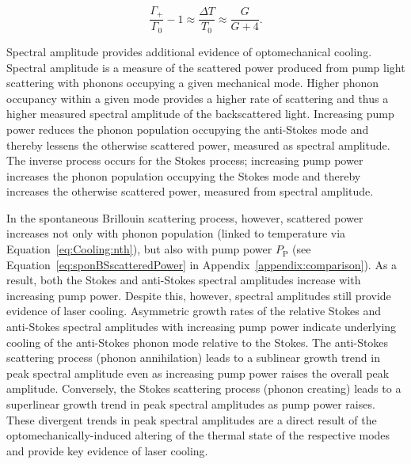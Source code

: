 \begin{equation}
  \frac{\Gamma_{+}}{\Gamma_{0}} - 1 \approx \frac{\Delta T}{T_{0}} \approx \frac{G}{G + 4}.
  \label{eq:Cooliong:two methods of getting temperature}
\end{equation}

Spectral amplitude provides additional evidence of optomechanical cooling. Spectral amplitude is a measure of the scattered power produced from pump light scattering with phonons occupying a given mechanical mode. Higher phonon occupancy within a given mode provides a higher rate of scattering and thus a higher measured spectral amplitude of the backscattered light. Increasing pump power reduces the phonon population occupying the anti-Stokes mode and thereby lessens the otherwise scattered power, measured as spectral amplitude. The inverse process occurs for the Stokes process; increasing pump power increases the phonon population occupying the Stokes mode and thereby increases the otherwise scattered power, measured from spectral amplitude.

In the spontaneous Brillouin scattering process, however, scattered power increases not only with phonon population (linked to temperature via Equation~\ref{eq:Cooling:nth}), but also with pump power \(P_{\mathrm{P}}\) (see Equation~\ref{eq:sponBSscatteredPower} in Appendix~\ref{appendix:comparison}). As a result, both the Stokes and anti-Stokes spectral amplitudes increase with increasing pump power. Despite this, however, spectral amplitudes still provide evidence of laser cooling. Asymmetric growth rates of the relative Stokes and anti-Stokes spectral amplitudes with increasing pump power indicate underlying cooling of the anti-Stokes phonon mode relative to the Stokes. The anti-Stokes scattering process (phonon annihilation) leads to a sublinear growth trend in peak spectral amplitude even as increasing pump power raises the overall peak amplitude. Conversely, the Stokes scattering process (phonon creating) leads to a superlinear growth trend in peak spectral amplitudes as pump power raises. These divergent trends in peak spectral amplitudes are a direct result of the optomechanically-induced altering of the thermal state of the respective modes and provide key evidence of laser cooling.

